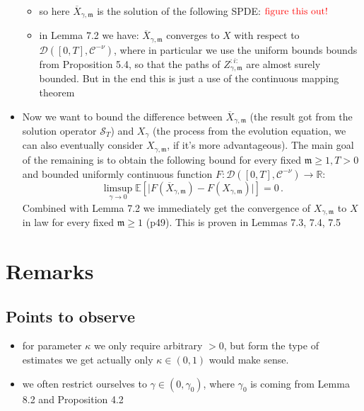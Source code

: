 \documentclass{report}
\theoremstyle{remark}
\theoremstyle{definition}
\begin{document}
\begin{itemize}
  \begin{itemize}
    \item so here $\overline{X}_{\gamma, \mathfrak{m}}$ is the solution of the following SPDE: $\textcolor{red}{\text{figure this out!}}$ 
    \item in Lemma 7.2 we have: $\overline{X}_{\gamma, \mathfrak{m}}$ converges to $X$ with respect to $\mathcal{D}([0, T], \mathcal{C}^{-\nu})$, where in particular we use the uniform bounds bounds from Proposition 5.4, so that the paths of $Z_{\gamma, \mathfrak{m}}^{:i:}$ are almost surely bounded. But in the end this is just a use of the continuous mapping theorem
  \end{itemize}
  \item Now we want to bound the difference between $\overline{X}_{\gamma, \mathfrak{m}}$ (the result got from the solution operator $\mathcal{S}_T$) and $X_\gamma$ (the process from the evolution equation, we can also eventually consider $X_{\gamma, \mathfrak{m}}$, if it's more advantageous). The main goal of the remaining is to obtain the following bound for every fixed $\mathfrak{m} \ge 1, T > 0$ and bounded uniformly continuous function $F: \mathcal{D}([0, T], \mathcal{C}^{-\nu}) \to \mathbb{R}$: $$\limsup_{\gamma \to 0} \mathbb{E}\left[\lvert F(\overline{X}_{\gamma, \mathfrak{m}}) - F({X}_{\gamma, \mathfrak{m}})\rvert\right] = 0\,.$$Combined with Lemma 7.2 we immediately get the convergence of ${X}_{\gamma, \mathfrak{m}}$ to $X$ in law for every fixed $\mathfrak{m} \ge 1$ (p49). This is proven in Lemmas 7.3, 7.4, 7.5
\end{itemize}

\chapter{Remarks}
\section{Points to observe}
\begin{itemize}
  \item for parameter $\kappa$ we only require arbitrary $> 0$, but form the type of estimates we get actually only $\kappa \in (0, 1)$ would make sense.
  \item we often restrict ourselves to $\gamma \in (0, \gamma_0)$, where $\gamma_0$ is coming from Lemma 8.2 and Proposition 4.2
\end{itemize}

\medskip
\printbibliography
\end{document}
